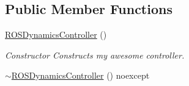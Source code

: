 \subsection*{Public Member Functions}
\begin{DoxyCompactItemize}
\item 
\hypertarget{classhiqp_1_1ROSDynamicsController_ab25caf17b0f140092447b5209eb7ddd4}{\hyperlink{classhiqp_1_1ROSDynamicsController_ab25caf17b0f140092447b5209eb7ddd4}{R\-O\-S\-Dynamics\-Controller} ()}\label{classhiqp_1_1ROSDynamicsController_ab25caf17b0f140092447b5209eb7ddd4}

\begin{DoxyCompactList}\small\item\em Constructor Constructs my awesome controller. \end{DoxyCompactList}\item 
\hypertarget{classhiqp_1_1ROSDynamicsController_a007a61fdaa35652378b259ceb971d409}{\hyperlink{classhiqp_1_1ROSDynamicsController_a007a61fdaa35652378b259ceb971d409}{$\sim$\-R\-O\-S\-Dynamics\-Controller} () noexcept}\label{classhiqp_1_1ROSDynamicsController_a007a61fdaa35652378b259ceb971d409}


\end{DoxyCompactItemize}
